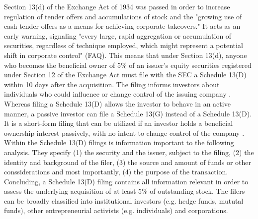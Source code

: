 \documentclass[12pt]{article}
\begin{document}
Section 13(d) of the Exchange Act of 1934 was passed in order to increase regulation of tender offers and accumulations of stock and the "growing use of cash tender offers as a means for achieving corporate takeovers."  
It acts as an early warning, signaling "every large, rapid aggregation or accumulation of securities, regardless of technique employed, which might represent a potential shift in corporate control" (FAQ). 
This means that under Section 13(d), anyone who becomes the beneficial owner of 5\% of an issuer's equity securities registered under Section 12 of the Exchange Act must file with the SEC a Schedule 13(D) within 10 days after the acquisition. The filing informs investors about individuals who could influence or change control of the issuing company \citep{Giglia2018}. Whereas filing a Schedule 13(D) allows the investor to behave in an active manner, a passive investor can file a Schedule 13(G) instead of a Schedule 13(D). It is a short-form filing that can be utilized if an investor holds a beneficial ownership interest passively, with no intent to change control of the company \citep{Giglia2018}. Within the Schedule 13(D) filings is information important to the following analysis. They specify (1) the security and the issuer, subject to the filing, (2) the identity and background of the filer, (3) the source and amount of funds or other conssiderations and most importantly, (4) the purpose of the transaction. Concluding, a Schedule 13(D) filing contains all information relevant in order to assess the underlying acquisition of at least 5\% of outstanding stock. The filers can be broadly classified into institutional investors (e.g. hedge funds, mututal funds), other entrepreneurial activists (e.g. individuals) \citep{Klein2009} and corporations. 
\end{document}
